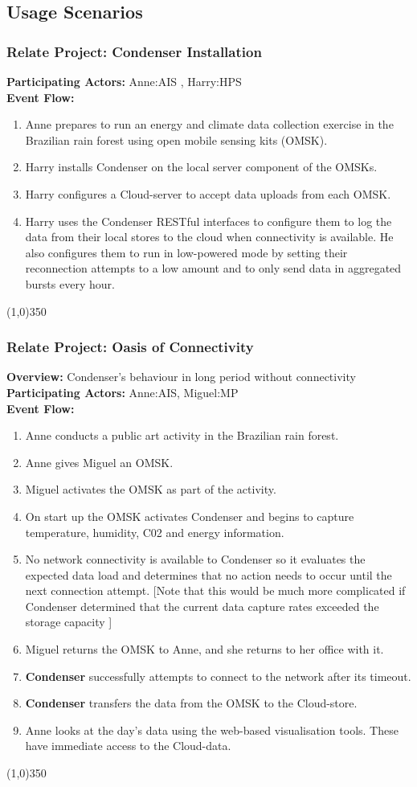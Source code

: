 \subsection{Usage Scenarios}
			\subsubsection{Relate Project: Condenser Installation}
			\textbf{Participating Actors:}  Anne:AIS , Harry:HPS \\
\textbf{Event Flow:}
	\begin{enumerate}
\item  Anne prepares to run an energy and climate data collection exercise in the Brazilian rain forest using open mobile sensing kits (OMSK).
\item  Harry installs Condenser on the local server component of the OMSKs.
\item  Harry configures a Cloud-server to accept data uploads from each OMSK.
\item  Harry uses the Condenser RESTful interfaces to configure them to log the data from their local stores to the cloud when connectivity is available. He also configures them to run in low-powered mode by setting their reconnection attempts to a low amount and to only send data in aggregated bursts every hour.
	\end{enumerate}
	\line(1,0){350}
			\subsubsection{Relate Project: Oasis of Connectivity}
			\textbf{Overview:} Condenser's behaviour in long period without connectivity \\
			\textbf{Participating Actors:}  Anne:AIS, Miguel:MP \\
\textbf{Event Flow:}
	\begin{enumerate}
\item Anne conducts a public art activity in the Brazilian rain forest.
\item Anne gives Miguel an OMSK.
\item Miguel activates the OMSK as part of the activity.
\item On start up the OMSK activates Condenser and begins to capture temperature, humidity, C02 and energy information.
\item No network connectivity is available to Condenser so it evaluates the expected data load and determines that no action needs to occur until the next connection attempt. [Note that this would be much more complicated if Condenser determined that the current data capture rates exceeded the storage capacity ]
\item Miguel returns the OMSK to Anne, and she returns to her office with it.
\item \textbf{Condenser} successfully attempts to connect to the network after its timeout. 
\item \textbf{Condenser} transfers the data from the OMSK to the Cloud-store.
\item Anne looks at the day's data using the web-based visualisation tools. These have immediate access to the Cloud-data.
	\end{enumerate}
	\line(1,0){350}	
